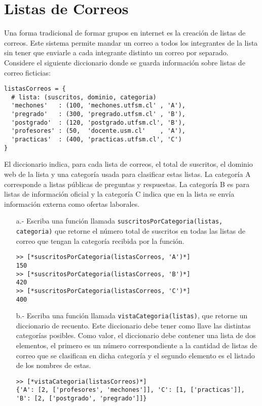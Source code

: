 \section{Listas de Correos}

Una forma tradicional de formar grupos en internet es la creación de listas de correos.
Este sistema permite mandar un correo a todos los integrantes de la lista sin tener que enviarle a cada integrante distinto un correo por separado.
Considere el siguiente diccionario donde se guarda información sobre listas de correo ficticias:
  
\begin{lstlisting}[style=consola]
listasCorreos = {
  # lista: (suscritos, dominio, categoria)
  'mechones'   : (100, 'mechones.utfsm.cl' , 'A'),
  'pregrado'   : (300, 'pregrado.utfsm.cl' , 'B'),
  'postgrado'  : (120, 'postgrado.utfsm.cl', 'B'),
  'profesores' : (50,  'docente.usm.cl'    , 'A'),
  'practicas'  : (400, 'practicas.utfsm.cl', 'C')
}
\end{lstlisting}
  
El diccionario indica, para cada lista de correos, el total de suscritos, el dominio web de la lista y una categoría usada para clasificar estas listas.
La categoría A corresponde a listas públicas de preguntas y respuestas.
La categoría B es para listas de información oficial y la categoría C indica que en la lista se envía información externa como ofertas laborales.
  
\begin{itemize}
    \item[a.-] Escriba una función llamada \texttt{suscritosPorCategoria(listas, categoria)} que retorne el número total de suscritos en todas las listas de correo que tengan la categoría recibida por la función.

\begin{lstlisting}[style=consola]
>> [*suscritosPorCategoria(listasCorreos, 'A')*]
150
>> [*suscritosPorCategoria(listasCorreos, 'B')*]
420
>> [*suscritosPorCategoria(listasCorreos, 'C')*]
400
\end{lstlisting}

    \item[b.-] Escriba una función llamada \texttt{vistaCategoria(listas)}, que retorne un diccionario de recuento. Este diccionario debe tener como llave las distintas categorías posibles. Como valor, el diccionario debe contener una lista de dos elementos, el primero es un número correspondiente a la cantidad de listas de correo que se clasifican en dicha categoría y el segundo elemento es el listado de los nombres de estas.

\begin{lstlisting}[style=consola]
>> [*vistaCategoria(listasCorreos)*]
{'A': [2, ['profesores', 'mechones']], 'C': [1, ['practicas']],
'B': [2, ['postgrado', 'pregrado']]}
\end{lstlisting}
\end{itemize}
